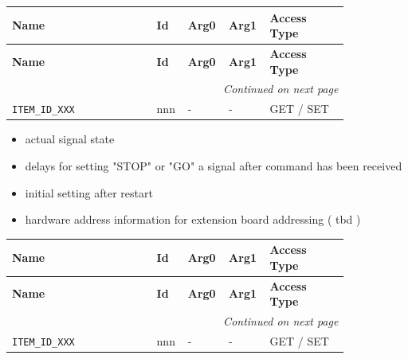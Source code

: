 \begin{longtable}{@{}|p{0.4\linewidth}|p{0.06\linewidth}|p{0.08\linewidth}|p{0.08\linewidth}|p{0.22\linewidth}|@{}}
    \toprule
    \textbf{Name} & \textbf{Id} & \textbf{Arg0} & \textbf{Arg1} & \textbf{Access Type} \\
    \midrule
    \midrule
    \endfirsthead
    \toprule
    \textbf{Name} & \textbf{Id} & \textbf{Arg0} & \textbf{Arg1} & \textbf{Access Type} \\
    \midrule
     \midrule
    \endhead
    \midrule
    \multicolumn{5}{r}{\textit{Continued on next page}} \\
    \midrule
    \endfoot
    \bottomrule
    \endlastfoot

    \texttt{ITEM\_ID\_XXX}       & nnn   & - & - & GET / SET \\
    \midrule
   
\end{longtable}


\begin{itemize}
\item actual signal state
\item delays for setting "STOP" or "GO" a signal after command has been received
\item initial setting after restart
\item hardware address information for extension board addressing ( tbd )
\end{itemize}

\begin{longtable}{@{}|p{0.4\linewidth}|p{0.06\linewidth}|p{0.08\linewidth}|p{0.08\linewidth}|p{0.22\linewidth}|@{}}
    \toprule
    \textbf{Name} & \textbf{Id} & \textbf{Arg0} & \textbf{Arg1} & \textbf{Access Type} \\
    \midrule
    \midrule
    \endfirsthead
    \toprule
    \textbf{Name} & \textbf{Id} & \textbf{Arg0} & \textbf{Arg1} & \textbf{Access Type} \\
    \midrule
     \midrule
    \endhead
    \midrule
    \multicolumn{5}{r}{\textit{Continued on next page}} \\
    \midrule
    \endfoot
    \bottomrule
    \endlastfoot

    \texttt{ITEM\_ID\_XXX}       & nnn   & - & - & GET / SET \\
    \midrule
   
\end{longtable}



